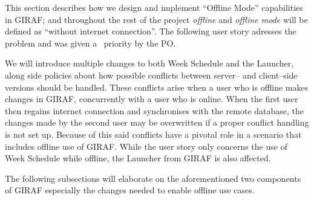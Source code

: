 This section describes how we design and implement \enquote{Offline Mode} capabilities in GIRAF; and throughout the rest of the project \textit{offline} and \textit{offline mode} will be defined as \enquote{without internet connection}.
The following user story adresses the problem and was given a \phigh~priority by the PO.

\begin{center}
\end{center}

We will introduce multiple changes to both Week Schedule and the Launcher, along side policies about how possible conflicts between server-- and client--side versions should be handled.
These conflicts arise when a user who is offline makes changes in GIRAF, concurrently with a user who is online.
When the first user then regains internet connection and synchronises with the remote database, the changes made by the second user may be overwritten if a proper conflict handling is not set up.
Because of this said conflicts have a pivotal role in a scenario that includes offline use of GIRAF.
While the user story only concerns the use of Week Schedule while offline, the Launcher from GIRAF is also affected.

The following subsections will elaborate on the aforementioned two components of GIRAF especially the changes needed to enable offline use cases.

